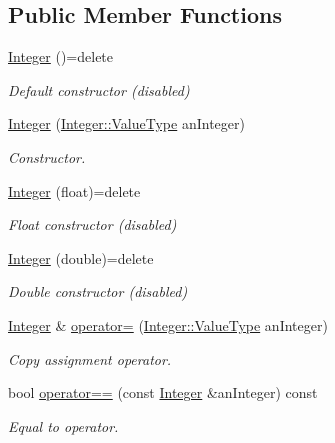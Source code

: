 \subsection*{Public Member Functions}
\begin{DoxyCompactItemize}
\item 
\hyperlink{classostk_1_1core_1_1types_1_1_integer_a209b939281106d4b590ad98fae291af9}{Integer} ()=delete
\begin{DoxyCompactList}\small\item\em Default constructor (disabled) \end{DoxyCompactList}\item 
\hyperlink{classostk_1_1core_1_1types_1_1_integer_a0fe4f9a8a209fc08669a2810bcec5995}{Integer} (\hyperlink{classostk_1_1core_1_1types_1_1_integer_a76a5f41f78659f116eafaf26cecc3244}{Integer\+::\+Value\+Type} an\+Integer)
\begin{DoxyCompactList}\small\item\em Constructor. \end{DoxyCompactList}\item 
\hyperlink{classostk_1_1core_1_1types_1_1_integer_af419f66b1b31f0202685de245917bea8}{Integer} (float)=delete
\begin{DoxyCompactList}\small\item\em Float constructor (disabled) \end{DoxyCompactList}\item 
\hyperlink{classostk_1_1core_1_1types_1_1_integer_a1a6bd5306dca9f79dd54956c93952338}{Integer} (double)=delete
\begin{DoxyCompactList}\small\item\em Double constructor (disabled) \end{DoxyCompactList}\item 
\hyperlink{classostk_1_1core_1_1types_1_1_integer}{Integer} \& \hyperlink{classostk_1_1core_1_1types_1_1_integer_a2c5e55747841b6810a8769acbbc9393e}{operator=} (\hyperlink{classostk_1_1core_1_1types_1_1_integer_a76a5f41f78659f116eafaf26cecc3244}{Integer\+::\+Value\+Type} an\+Integer)
\begin{DoxyCompactList}\small\item\em Copy assignment operator. \end{DoxyCompactList}\item 
bool \hyperlink{classostk_1_1core_1_1types_1_1_integer_af00416fe28c7d4aec55bd45c031fdb41}{operator==} (const \hyperlink{classostk_1_1core_1_1types_1_1_integer}{Integer} \&an\+Integer) const
\begin{DoxyCompactList}\small\item\em Equal to operator. \end{DoxyCompactList}\item 

\end{DoxyCompactItemize}
